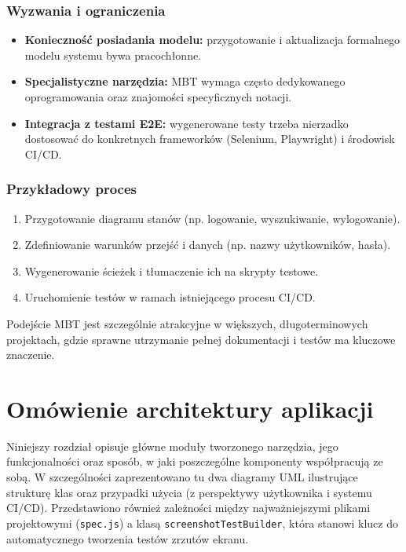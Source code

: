 \documentclass[12pt]{report}
\begin{document}
\subsection*{Wyzwania i ograniczenia}
\begin{itemize}
    \item \textbf{Konieczność posiadania modelu:} przygotowanie i aktualizacja formalnego modelu systemu bywa pracochłonne.
    \item \textbf{Specjalistyczne narzędzia:} MBT wymaga często dedykowanego oprogramowania oraz znajomości specyficznych notacji.
    \item \textbf{Integracja z testami E2E:} wygenerowane testy trzeba nierzadko dostosować do konkretnych frameworków (Selenium, Playwright) i środowisk CI/CD.
\end{itemize}

\subsection*{Przykładowy proces}
\begin{enumerate}
    \item Przygotowanie diagramu stanów (np. logowanie, wyszukiwanie, wylogowanie).
    \item Zdefiniowanie warunków przejść i danych (np. nazwy użytkowników, hasła).
    \item Wygenerowanie ścieżek i tłumaczenie ich na skrypty testowe.
    \item Uruchomienie testów w ramach istniejącego procesu CI/CD.
\end{enumerate}

Podejście MBT jest szczególnie atrakcyjne w większych, długoterminowych projektach, gdzie sprawne utrzymanie pełnej dokumentacji i testów ma kluczowe znaczenie.


\chapter{Omówienie architektury aplikacji}
\label{chap:omowienie-architektury}

Niniejszy rozdział opisuje główne moduły tworzonego narzędzia, jego funkcjonalności oraz sposób, w jaki poszczególne komponenty współpracują ze sobą. W szczególności zaprezentowano tu dwa diagramy UML ilustrujące strukturę klas oraz przypadki użycia (z perspektywy użytkownika i systemu CI/CD). Przedstawiono również zależności między najważniejszymi plikami projektowymi (\texttt{spec.js}) a klasą \texttt{screenshotTestBuilder}, która stanowi klucz do automatycznego tworzenia testów zrzutów ekranu.
\end{document}
